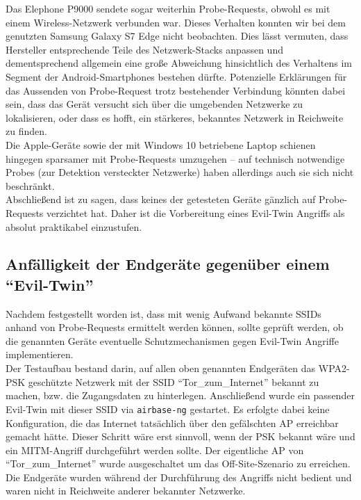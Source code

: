 Das Elephone P9000 sendete sogar weiterhin Probe-Requests, obwohl es mit einem Wireless-Netzwerk verbunden war. Dieses Verhalten konnten wir bei dem genutzten Samsung Galaxy S7 Edge nicht beobachten. Dies lässt vermuten, dass Hersteller entsprechende Teile des Netzwerk-Stacks anpassen und dementsprechend allgemein eine große Abweichung hinsichtlich des Verhaltens im Segment der Android-Smartphones bestehen dürfte.
Potenzielle Erklärungen für das Aussenden von Probe-Request trotz bestehender Verbindung könnten dabei sein, dass das Gerät versucht sich über die umgebenden Netzwerke zu lokalisieren, oder dass es hofft, ein stärkeres, bekanntes Netzwerk in Reichweite zu finden.\\

Die Apple-Geräte sowie der mit Windows 10 betriebene Laptop schienen hingegen sparsamer mit Probe-Requests umzugehen -- auf technisch notwendige Probes (zur Detektion versteckter Netzwerke) haben allerdings auch sie sich nicht beschränkt.\\

Abschließend ist zu sagen, dass keines der getesteten Geräte gänzlich auf Probe-Requests verzichtet hat.
Daher ist die Vorbereitung eines Evil-Twin Angriffs als absolut praktikabel einzustufen.

\subsection{Anfälligkeit der Endgeräte gegenüber einem \enquote{Evil-Twin}}
Nachdem festgestellt worden ist, dass mit wenig Aufwand bekannte SSIDs anhand von Probe-Requests ermittelt werden können, sollte geprüft werden, ob die genannten Geräte eventuelle Schutzmechanismen gegen Evil-Twin Angriffe implementieren.\\

Der Testaufbau bestand darin, auf allen oben genannten Endgeräten das WPA2-PSK geschützte Netzwerk mit der SSID \enquote{Tor\_zum\_Internet} bekannt zu machen, bzw. die Zugangsdaten zu hinterlegen.
Anschließend wurde ein passender Evil-Twin mit dieser SSID via \texttt{airbase-ng} gestartet. Es erfolgte dabei keine Konfiguration, die das Internet tatsächlich über den gefälschten AP erreichbar gemacht hätte. Dieser Schritt wäre erst sinnvoll, wenn der PSK bekannt wäre und ein MITM-Angriff durchgeführt werden sollte. Der eigentliche AP von \enquote{Tor\_zum\_Internet} wurde ausgeschaltet um das Off-Site-Szenario zu erreichen.
Die Endgeräte wurden während der Durchführung des Angriffs nicht bedient und waren nicht in Reichweite anderer bekannter Netzwerke.

